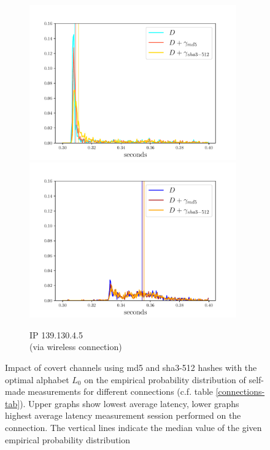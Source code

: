 \documentclass[12pt,a4paper,automark, toc=bib]{scrreprt}
\theoremstyle{definition}
\begin{document}
\begin{figure}
\begin{subfigure}{0.32\textwidth}
					\includegraphics[width=0.98\textwidth]{figures/_AUS_complete_light.pdf}
					\includegraphics[width=0.98\textwidth]{figures/_AUS_complete_dark.pdf}
					\caption{IP 139.130.4.5 \\(via wireless connection)}
				\end{subfigure}
					\begin{subfigure}{0.32\linewidth}
					\hphantom{a}
				\end{subfigure}
				
				\caption{Impact of covert channels using md5 and sha3-512  hashes with the optimal alphabet $L_0$ on the empirical probability distribution of self-made measurements for different connections (c.f. table \ref{connections-tab}). Upper graphs show lowest average latency, lower graphs highest average latency measurement session performed on the connection. The vertical lines indicate the median value of the given empirical probability distribution}
				\label{comparison-fig}
			\end{figure}
			
\end{document}
